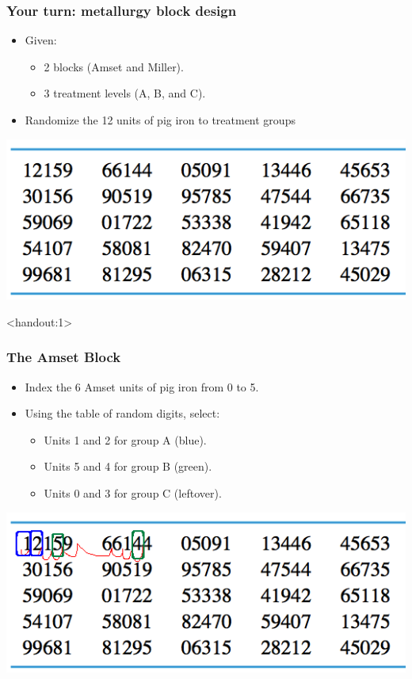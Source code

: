 \documentclass[handout]{beamer}
\newcommand{\answers}{1}
\numberwithin{equation}{section}
\begin{document}
\begin{frame}
\frametitle{Your turn: metallurgy block design}

\begin{itemize}
\item Given:
\begin{itemize}
\item 2 blocks (Amset and Miller).
\item 3 treatment levels (A, B, and C).
\end{itemize}
\item Randomize the 12 units of pig iron to treatment groups
\end{itemize}

\begin{center}
 \includegraphics{../../fig/rdigitsshort.png}
\end{center}
\end{frame}


\begin{frame}<handout:\answers>
\frametitle{The Amset Block}

\begin{itemize}
 \item Index the 6 Amset units of pig iron from 0 to 5.
\pause \item Using the table of random digits, select:
\begin{itemize}
\pause \item Units 1 and 2 for group A (blue).
\pause \item Units 5 and 4 for group B (green).
\pause \item Units 0 and 3 for group C (leftover).
\end{itemize}
\end{itemize}

\begin{center}
 \includegraphics{../../fig/rdigitsshortAmset.png}
\end{center}

\end{frame}
\end{document}
